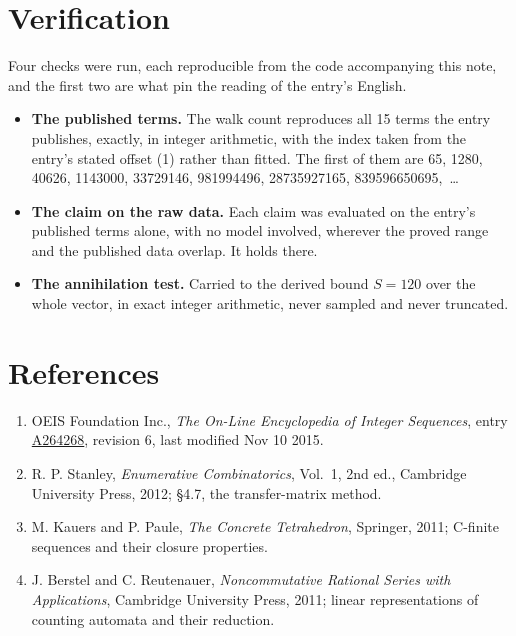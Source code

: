 \documentclass[11pt]{article}
\theoremstyle{definition}
\begin{document}
\section{Verification}

Four checks were run, each reproducible from the code accompanying this note, and the first two are what pin the reading of the entry's English.

\begin{itemize}

\item {\bfseries The published terms.} The walk count reproduces all 15 terms the entry publishes, exactly, in integer arithmetic, with the index taken from the entry's stated offset (1) rather than fitted. The first of them are 65, 1280, 40626, 1143000, 33729146, 981994496, 28735927165, 839596650695,~\dots

\item {\bfseries The claim on the raw data.} Each claim was evaluated on the entry's published terms alone, with no model involved, wherever the proved range and the published data overlap. It holds there.

\item {\bfseries The annihilation test.} Carried to the derived bound $S = 120$ over the whole vector, in exact integer arithmetic, never sampled and never truncated.

\end{itemize}

\section{References}

\begin{enumerate}

\item OEIS Foundation Inc., \emph{The On-Line Encyclopedia of Integer Sequences}, entry \href{https://oeis.org/A264268}{A264268}, revision 6, last modified Nov 10 2015.

\item R. P. Stanley, \emph{Enumerative Combinatorics}, Vol.~1, 2nd ed., Cambridge University Press, 2012; \S4.7, the transfer-matrix method.

\item M. Kauers and P. Paule, \emph{The Concrete Tetrahedron}, Springer, 2011; C-finite sequences and their closure properties.

\item J. Berstel and C. Reutenauer, \emph{Noncommutative Rational Series with Applications}, Cambridge University Press, 2011; linear representations of counting automata and their reduction.

\end{enumerate}
\end{document}
